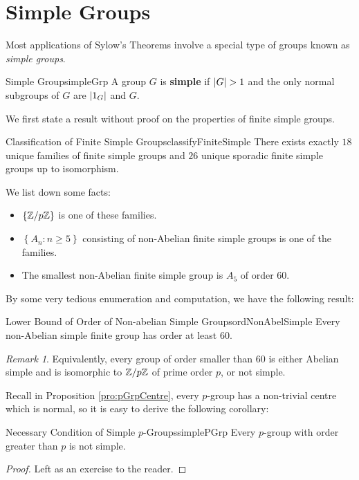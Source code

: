 \documentclass[math]{amznotes}
\theoremstyle{remark}
\newtheorem*{remark}{Remark}
\newcommand{\0}{\mathbf{0}}
\newcommand{\1}{\mathbf{1}}
\begin{document}
\section{Simple Groups}
Most applications of Sylow's Theorems involve a special type of groups known as \textit{simple groups}.
\begin{dfnbox}{Simple Group}{simpleGrp}
    A group $G$ is {\color{red} \textbf{simple}} if ${\left\lvert {G} \right\rvert} > 1$ and the only normal subgroups of $G$ are ${\left\lvert {1_G} \right\rvert}$ and $G$.
\end{dfnbox}
We first state a result without proof on the properties of finite simple groups.
\begin{thmbox}{Classification of Finite Simple Groups}{classifyFiniteSimple}
    There exists exactly $18$ unique families of finite simple groups and $26$ unique sporadic finite simple groups up to isomorphism.
\end{thmbox}
We list down some facts:
\begin{itemize}
    \item $\left\{\mathbb{Z} \slash p\mathbb{Z}\right\}$ is one of these families.
    \item $\left\{A_n \colon n \geq 5\right\}$ consisting of non-Abelian finite simple groups is one of the families.
    \item The smallest non-Abelian finite simple group is $A_5$ of order $60$.
\end{itemize}
By some very tedious enumeration and computation, we have the following result:
\begin{thmbox}{Lower Bound of Order of Non-abelian Simple Groups}{ordNonAbelSimple}
    Every non-Abelian simple finite group has order at least $60$.
\end{thmbox}
\begin{notebox}
    \begin{remark}
        Equivalently, every group of order smaller than $60$ is either Abelian simple and is isomorphic to $\mathbb{Z} \slash p\mathbb{Z}$ of prime order $p$, or not simple.
    \end{remark}
\end{notebox}
Recall in Proposition \ref{pro:pGrpCentre}, every $p$-group has a non-trivial centre which is normal, so it is easy to derive the following corollary:
\begin{corbox}{Necessary Condition of Simple $p$-Groups}{simplePGrp}
    Every $p$-group with order greater than $p$ is not simple.
    \tcblower
    \begin{proof}
        Left as an exercise to the reader.
    \end{proof}
\end{corbox}
\end{document}
